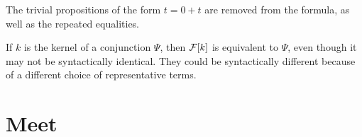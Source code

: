 The trivial propositions of the form $t = 0 + t$ are removed from the formula, as well as the repeated equalities.

If $k$ is the kernel of a conjunction $\Psi$, then $\mathcal{F}[k]$ is equivalent to $\Psi$,
even though it may not be syntactically identical.
They could be syntactically different because of a different choice of representative terms.





\section{Meet}




